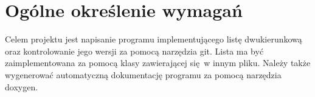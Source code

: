 	\newpage
\section{Ogólne określenie wymagań}		%

\hspace{0.60cm}

Celem projektu jest napisanie programu implementującego listę dwukierunkową oraz kontrolowanie jego wersji za pomocą narzędzia git. Lista ma być zaimplementowana za pomocą klasy zawierającej się w innym pliku. Należy także wygenerować automatyczną dokumentację programu za pomocą narzędzia doxygen.  
